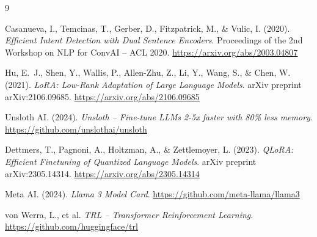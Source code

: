 \documentclass[12pt,a4paper]{article}
\begin{document}
\newpage
\begin{thebibliography}{9}

Casanueva, I., Temcinas, T., Gerber, D., Fitzpatrick, M., \& Vulic, I. (2020).
\textit{Efficient Intent Detection with Dual Sentence Encoders}.
Proceedings of the 2nd Workshop on NLP for ConvAI -- ACL 2020.
\url{https://arxiv.org/abs/2003.04807}

Hu, E.~J., Shen, Y., Wallis, P., Allen-Zhu, Z., Li, Y., Wang, S., \& Chen, W. (2021).
\textit{LoRA: Low-Rank Adaptation of Large Language Models}.
arXiv preprint arXiv:2106.09685.
\url{https://arxiv.org/abs/2106.09685}

Unsloth AI. (2024). \textit{Unsloth -- Fine-tune LLMs 2-5x faster with 80\% less memory}.
\url{https://github.com/unslothai/unsloth}

Dettmers, T., Pagnoni, A., Holtzman, A., \& Zettlemoyer, L. (2023).
\textit{QLoRA: Efficient Finetuning of Quantized Language Models}.
arXiv preprint arXiv:2305.14314.
\url{https://arxiv.org/abs/2305.14314}

Meta AI. (2024). \textit{Llama 3 Model Card}.
\url{https://github.com/meta-llama/llama3}

von Werra, L., et al. \textit{TRL -- Transformer Reinforcement Learning}.
\url{https://github.com/huggingface/trl}

\end{thebibliography}
\end{document}
